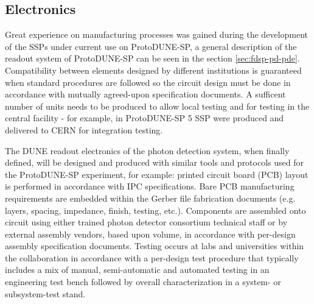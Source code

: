 


\subsection{Electronics}
\label{sec:fdsp-pd-assy-pde}

Great experience on manufacturing processes was gained during the development of the SSPs under current use on ProtoDUNE-SP, a general description of the readout system of ProtoDUNE-SP can be seen in the section \ref{sec:fdsp-pd-pde}. Compatibility between elements designed by different institutions is guaranteed when standard procedures are followed so the circuit design must be done in accordance with mutually agreed-upon specification documents.  A sufficent  number of units needs to be produced to allow local testing and for testing in the central facility - for example, in ProtoDUNE-SP \num{5} SSP were produced and delivered to CERN for integration testing.

The DUNE readout electronics of the photon detection system, when finally defined, will be designed and produced with similar tools and protocols used for the ProtoDUNE-SP experiment, for example: printed circuit board (PCB) layout is performed in accordance with IPC specifications. Bare PCB manufacturing requirements are embedded within the Gerber file fabrication documents (e.g. layers, spacing, impedance, finish, testing, etc.). Components are assembled onto circuit using either trained photon detector consortium technical staff or by external assembly vendors, based upon volume, in accordance with per-design assembly specification documents. Testing occurs at labs and universities within the collaboration in accordance with a per-design test procedure that typically includes a mix of manual, semi-automatic and automated testing in an engineering test bench followed by overall characterization in a system- or subsystem-test stand.


